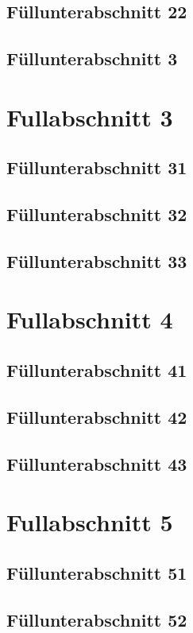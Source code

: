 \documentclass[arbeit=studie,oneside,BCOR=12mm]{ArbeitRST}
\begin{document}
\subsection{Füllunterabschnitt 22}
\Blindtext[1][1]
\subsection{Füllunterabschnitt 3}
\Blindtext[1][1]


\section{Fullabschnitt 3}
\subsection{Füllunterabschnitt 31}
\Blindtext[1][1]
\subsection{Füllunterabschnitt 32}
\Blindtext[1][1]
\subsection{Füllunterabschnitt 33}
\Blindtext[1][1]


\section{Fullabschnitt 4}
\subsection{Füllunterabschnitt 41}
\Blindtext[1][1]
\subsection{Füllunterabschnitt 42}
\Blindtext[1][1]
\subsection{Füllunterabschnitt 43}
\Blindtext[1][1]


\section{Fullabschnitt 5}
\subsection{Füllunterabschnitt 51}
\Blindtext[1][1]
\subsection{Füllunterabschnitt 52}
\Blindtext[1][1]
\end{document}
